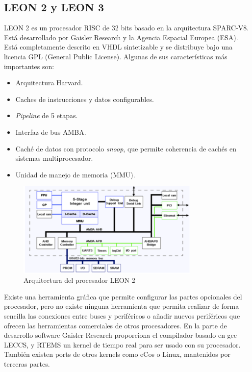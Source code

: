    	\subsection{LEON 2 y LEON 3}

LEON 2 es un procesador RISC de 32 bits basado en la arquitectura SPARC-V8\cite{Etiqueta33}. Está desarrollado por Gaisler Research y la Agencia Espacial Europea (ESA). Está completamente descrito en VHDL sintetizable y se distribuye bajo una licencia GPL (General Public License). Algunas de sus características más importantes son:

\begin{itemize}
		 \item  Arquitectura Harvard.
		 \item  Caches de instrucciones y datos configurables.
	       \item \textit{Pipeline} de 5 etapas.
		 \item  Interfaz de bus AMBA.
 		\item  Caché de datos con protocolo \textit{snoop}, que permite coherencia de cachés en sistemas multiprocesador.
		\item Unidad de manejo de memoria (MMU).
		\end{itemize}
	
\begin{figure}[h!]
 	\begin{center}
  	\includegraphics[width=0.8\textwidth,keepaspectratio=true]{./images/leon}
  	\caption{Arquitectura del procesador LEON 2}
 	\end{center}
	\end{figure}

Existe una herramienta gráfica que permite configurar las partes opcionales del procesador, pero no existe ninguna herramienta que permita realizar de forma sencilla las conexiones entre buses y periféricos o añadir nuevos periféricos que ofrecen las herramientas comerciales de otros procesadores. En la parte de desarrollo software Gaisler Research proporciona el compilador basado en gcc LECCS, y RTEMS un kernel de tiempo real para ser usado con su procesador. También existen ports de otros kernels como eCos o Linux, mantenidos por terceras partes.

